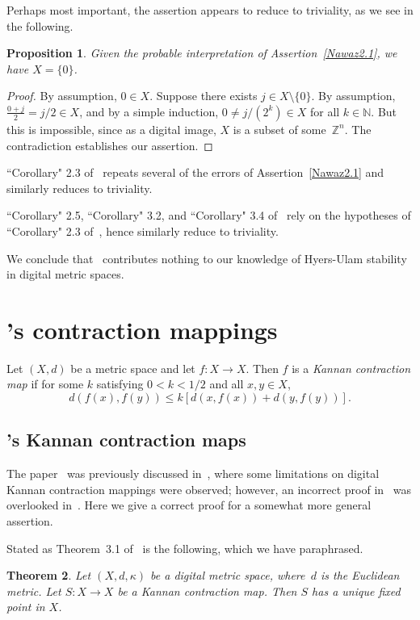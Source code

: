 \documentclass{article}
\newtheorem{thm}{Theorem}
\newtheorem{prop}[thm]{Proposition}
\numberwithin{thm}{section}
\def\Z{{\mathbb Z}}
\def\N{{\mathbb N}}
\begin{document}
Perhaps most important, the assertion
appears to reduce to triviality, as
we see in the following.

\begin{prop}
    Given the probable interpretation
    of Assertion~\ref{Nawaz2.1}, we
    have $X = \{0\}$.
\end{prop}

\begin{proof}
    By assumption, $0 \in X$. Suppose
    there exists $j \in X \setminus \{0\}$. By assumption,
    $\frac{0+j}{2} = j/2 \in X$, and
    by a simple induction, 
    $0 \neq j/(2^k) \in X$ for all $k \in \N$.
    But this is impossible, since
    as a digital image, $X$ is a subset
    of some~$\Z^n$. The contradiction
    establishes our assertion.
\end{proof}

``Corollary" 2.3 of~\cite{NawazEtal}
repeats several of the errors
of Assertion~\ref{Nawaz2.1} and
similarly reduces to triviality.

``Corollary" 2.5, ``Corollary" 3.2,
and ``Corollary" 3.4
of~\cite{NawazEtal}
rely on the hypotheses of
``Corollary" 2.3 of~\cite{NawazEtal},
hence similarly reduce to triviality.

We conclude that~\cite{NawazEtal}
contributes nothing to our knowledge
of Hyers-Ulam stability in digital
metric spaces.

\section{\cite{ParkEtAl,OkAk}'s contraction mappings}
Let $(X,d)$ be a metric space and let $f: X \to X$. Then $f$
is a {\em Kannan contraction map} if for some
$k$ satisfying $0 < k < 1/2$ and all $x,y \in X$,
\[ d(f(x), f(y)) \le k[d(x,f(x)) + d(y,f(y))].
\]


\subsection{\cite{ParkEtAl}'s Kannan contraction maps}
The paper~\cite{ParkEtAl} was previously discussed
in~\cite{BxSt19}, where some limitations on digital
Kannan contraction mappings were observed; however, an incorrect
proof in~\cite{ParkEtAl} 
was overlooked in~\cite{BxSt19}. 
Here we give a correct proof for
a somewhat more general assertion. 

Stated as Theorem~3.1 of~\cite{ParkEtAl} is the following, which we have paraphrased.

\begin{thm}
\label{ParkEtAl3.1}
    Let $(X,d,\kappa)$ be a digital metric space, where~$d$ is the 
    Euclidean metric. Let 
    $S: X \to X$ be a
    Kannan contraction map.
    Then $S$ has a unique fixed point in $X$.
\end{thm}
\end{document}

